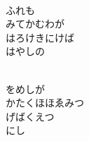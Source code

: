 \documentclass[10pt,b5j]{tarticle} %
\begin{document}
\begin{enumerate}
\begin{minipage}[c]{\blocksize}
        \vspace{\linespace}
        \item~\\
        ふれも\\
        みてかむわが\\
        はろけきにけば\\
        はやしの
        
    \end{minipage}
    \begin{minipage}[c]{\blocksize}
        
        \vspace{\linespace}
        \item~\\
        をめしが\\
        かたくほほゑみつ\\
        げばくえつ\\
        にし
    
    \end{minipage}
\end{enumerate} %
\end{document}
